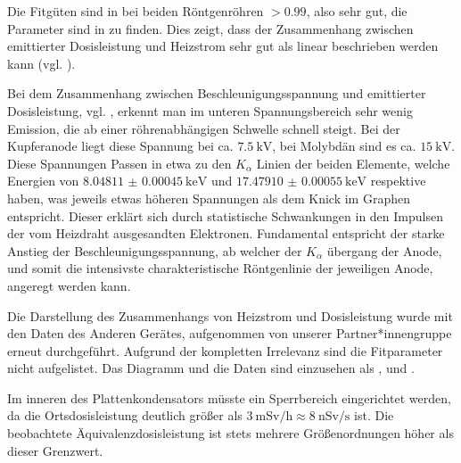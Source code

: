 Die Fitgüten sind in bei beiden Röntgenröhren $>0.99$, also sehr gut, die Parameter sind in  zu finden. Dies zeigt, dass der Zusammenhang zwischen emittierter Dosisleistung und Heizstrom sehr gut als linear beschrieben werden kann (vgl. ).

Bei dem Zusammenhang zwischen Beschleunigungsspannung und emittierter Dosisleistung, vgl. , erkennt man im unteren Spannungsbereich sehr wenig Emission, die ab einer röhrenabhängigen Schwelle schnell steigt. Bei der Kupferanode liegt diese Spannung bei ca. $\SI{7.5}{\kilo\volt}$, bei Molybdän sind es ca. $\SI{15}{\kilo\volt}$. Diese Spannungen Passen in etwa zu den $K_\alpha$ Linien der beiden Elemente, welche Energien von $\SI{8.04811(45)}{\kilo\eV}$ und $\SI{17.47910(55)}{\kilo\eV}$\cite{NISTxray} respektive haben, was jeweils etwas höheren Spannungen als dem Knick im Graphen entspricht. Dieser erklärt sich durch statistische Schwankungen in den Impulsen der vom Heizdraht ausgesandten Elektronen. Fundamental entspricht der starke Anstieg der Beschleunigungsspannung, ab welcher der $K_\alpha$ übergang der Anode, und somit die intensivste charakteristische Röntgenlinie der jeweiligen Anode, angeregt werden kann.



Die Darstellung des Zusammenhangs von Heizstrom und Dosisleistung wurde mit den Daten des Anderen Gerätes, aufgenommen von unserer Partner*innengruppe erneut durchgeführt. Aufgrund der kompletten Irrelevanz sind die Fitparameter nicht aufgelistet. Das Diagramm und die Daten sind einzusehen als ,  und .


Im inneren des Plattenkondensators müsste ein Sperrbereich eingerichtet werden, da die Ortsdosisleistung deutlich größer als $\SI{3}{\milli\sievert\per\hour} \approx \SI{8}{\nano\sievert\per\second}$ ist\cite[§52 Abs. 2]{strahlenschutzverordnung}. Die beobachtete Äquivalenzdosisleistung ist stets mehrere Größenordnungen höher als dieser Grenzwert.
